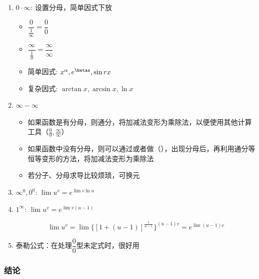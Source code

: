 \documentclass[../book.tex]{subfiles}
\begin{document}
\begin{enumerate}
\begin{itemize}
            当 $\color{red}{x \to \infty}$，则应抓分子和分母中关于 $x$ 的{\color{red}{最高次项}}即可判断极限； \\
            当 $\color{red}{x \to 0}$，则应抓分子和分母中关于 $x$ 的{\color{red}{最低次项}}
            \item 脱帽法: 若$\lim\limits_{x\to 0} f(x) = A$，则$f(x) = A + \alpha(x)$，其中$\lim\limits_{x\to 0} \alpha(x) = 0$
        \end{itemize}
        \item $0\cdot \infty$: 设置分母，简单因式下放
        \begin{itemize}
            \item $\dfrac{0}{\frac{1}{\infty}} = \dfrac{0}{0}$
            \item $\dfrac{\infty}{\frac{1}{0}} = \dfrac{\infty}{\infty}$
            \item 简单因式: $x^\alpha, e^{\betax}, \sin rx$
            \item 复杂因式: $\arctan x, \arcsin x, \ln x$
        \end{itemize}
        \item $\infty - \infty$
        \begin{itemize}
            \item 如果函数是有分母，则通分，将加减法变形为乘除法，以便使用其他计算工具（$\displaystyle\frac{0}{0}, \frac{\infty}{\infty}$）
            \item 如果函数中没有分母，则可以通过{\color{red}{提取公因式}}或者做{\color{red}{倒代换}}（{\color{red}{创造分母再通分}}），出现分母后，再利用通分等恒等变形的方法，将加减法变形为乘除法
            \item 若分子、分母求导比较烦琐，可换元
        \end{itemize}
        \item $\infty^0, 0^0$: $\lim u^v = e^{\lim v\ln u}$
        \item $1^\infty$: $\lim u^v = e^{\lim v(u - 1)}$
        \begin{analysisbox}[Example]
            \[
                \lim u^v = \lim \{[1 + (u - 1)]^{\frac{1}{u-1}}\}^{(u-1)v} = e^{\lim(u - 1)v}
            \]
        \end{analysisbox}
        \item 泰勒公式：在处理$\dfrac{0}{0}$型未定式时，很好用
    \end{enumerate}

    \subsubsection{结论}
\end{document}
